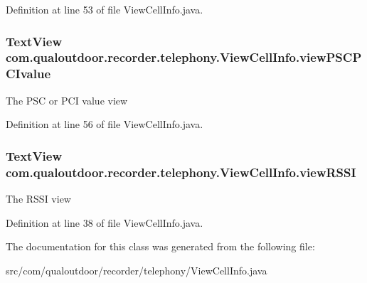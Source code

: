 Definition at line 53 of file View\-Cell\-Info.\-java.

\hypertarget{classcom_1_1qualoutdoor_1_1recorder_1_1telephony_1_1ViewCellInfo_a5f4d2fea79f9c4a1915c3988e11c875b}{
\subsubsection[{view\-P\-S\-C\-P\-C\-Ivalue}]{\setlength{\rightskip}{0pt plus 5cm}Text\-View com.\-qualoutdoor.\-recorder.\-telephony.\-View\-Cell\-Info.\-view\-P\-S\-C\-P\-C\-Ivalue\hspace{0.3cm}{\ttfamily [private]}}}\label{classcom_1_1qualoutdoor_1_1recorder_1_1telephony_1_1ViewCellInfo_a5f4d2fea79f9c4a1915c3988e11c875b}
The P\-S\-C or P\-C\-I value view 

Definition at line 56 of file View\-Cell\-Info.\-java.

\hypertarget{classcom_1_1qualoutdoor_1_1recorder_1_1telephony_1_1ViewCellInfo_a3225ef75cff62c8696bd3049e90fc387}{
\subsubsection[{view\-R\-S\-S\-I}]{\setlength{\rightskip}{0pt plus 5cm}Text\-View com.\-qualoutdoor.\-recorder.\-telephony.\-View\-Cell\-Info.\-view\-R\-S\-S\-I\hspace{0.3cm}{\ttfamily [private]}}}\label{classcom_1_1qualoutdoor_1_1recorder_1_1telephony_1_1ViewCellInfo_a3225ef75cff62c8696bd3049e90fc387}
The R\-S\-S\-I view 

Definition at line 38 of file View\-Cell\-Info.\-java.



The documentation for this class was generated from the following file\-:\begin{DoxyCompactItemize}
\item 
src/com/qualoutdoor/recorder/telephony/View\-Cell\-Info.\-java\end{DoxyCompactItemize}
